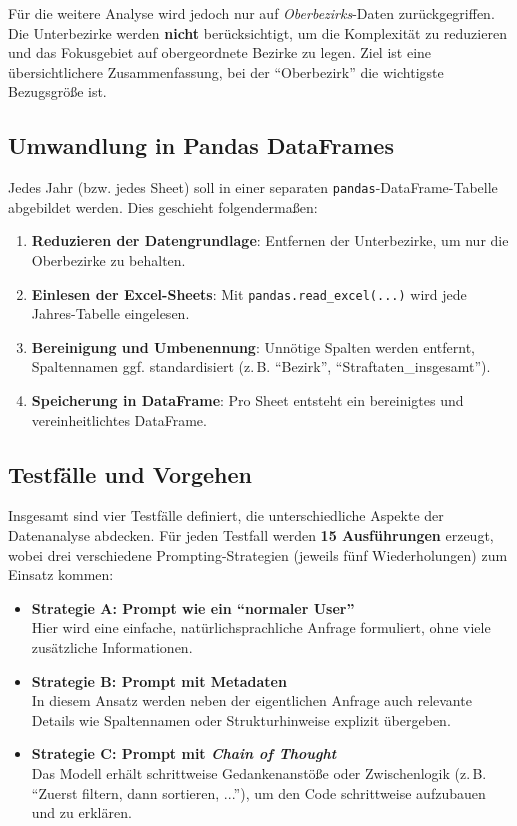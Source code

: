 \documentclass[11pt,a4paper]{article}
\begin{document}
Für die weitere Analyse wird jedoch nur auf \emph{Oberbezirks}-Daten zurückgegriffen. Die Unterbezirke werden \textbf{nicht} berücksichtigt, um die Komplexität zu reduzieren und das Fokusgebiet auf obergeordnete Bezirke zu legen. Ziel ist eine übersichtlichere Zusammenfassung, bei der \enquote{Oberbezirk} die wichtigste Bezugsgröße ist.

\subsection{Umwandlung in Pandas DataFrames}
Jedes Jahr (bzw. jedes Sheet) soll in einer separaten \texttt{pandas}-DataFrame-Tabelle abgebildet werden. Dies geschieht folgendermaßen:
\begin{enumerate}
    \item \textbf{Reduzieren der Datengrundlage}: Entfernen der Unterbezirke, um nur die Oberbezirke zu behalten.
    \item \textbf{Einlesen der Excel-Sheets}: Mit \texttt{pandas.read\_excel(...)} wird jede Jahres-Tabelle eingelesen.
    \item \textbf{Bereinigung und Umbenennung}: Unnötige Spalten werden entfernt, Spaltennamen ggf. standardisiert (z.\,B. \enquote{Bezirk}, \enquote{Straftaten\_insgesamt}).
    \item \textbf{Speicherung in DataFrame}: Pro Sheet entsteht ein bereinigtes und vereinheitlichtes DataFrame.
\end{enumerate}

\subsection{Testfälle und Vorgehen}
Insgesamt sind vier Testfälle definiert, die unterschiedliche Aspekte der Datenanalyse abdecken. Für jeden Testfall werden \textbf{15 Ausführungen} erzeugt, wobei drei verschiedene Prompting-Strategien (jeweils fünf Wiederholungen) zum Einsatz kommen:
\begin{itemize}
    \item \textbf{Strategie A: Prompt wie ein \enquote{normaler User}}\\
    Hier wird eine einfache, natürlichsprachliche Anfrage formuliert, ohne viele zusätzliche Informationen.
    \item \textbf{Strategie B: Prompt mit Metadaten}\\
    In diesem Ansatz werden neben der eigentlichen Anfrage auch relevante Details wie Spaltennamen oder Strukturhinweise explizit übergeben.
    \item \textbf{Strategie C: Prompt mit \emph{Chain of Thought}}\\
    Das Modell erhält schrittweise Gedankenanstöße oder Zwischenlogik (z.\,B. \enquote{Zuerst filtern, dann sortieren, ...}), um den Code schrittweise aufzubauen und zu erklären.
\end{itemize}
\end{document}
